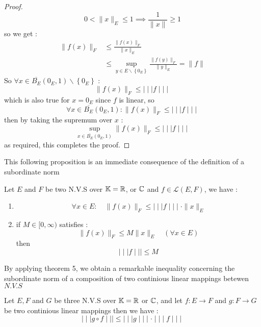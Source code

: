 \begin{proof}
  \[
  0 < \| x \| _{E} \leq 1 \implies 
  \frac{1}{\| x \| } \geq 1
  \]
  so we get : 
  \begin{align*}
	  \| f(x)  \| _{F} &\leq 
  \frac{\| f(x)  \|_{F} }{\| x \|_{E} }  \\
			   & \leq 
			   \sup_{ y \in E \backslash \left\{ 0_{E} \right\}} 
			   \frac{\| f(y)  \| _{F}}{ 
			   \| y \| _{E}} = 
			   \| f \|  
  \end{align*}
  So $ \forall  x \in \overline{B_{E}}\left( 0_{E},1 \right) 
  \backslash \left\{ 0_{E} \right\}$ : 
  \[
  \| f(x)  \| _{F} \leq \mid \mid \mid  f \mid \mid \mid 
  \]
  which is also true for $x = 0_{E}$ since $f$ is linear, so 
  \[
  \forall  x \in  \overline{B_{E}} \left( 0_{E},1 \right) :
  \| f(x)  \| _{F} \leq \mid \mid \mid  f \mid \mid \mid 
  \]
  then by taking the supremum over $x$ : 
  \[
  \sup_{ x \in \overline{B_{E}} \left( 0_{E},1 \right)}  
  \| f(x)  \| _{F} \leq 
  \mid \mid \mid  f \mid \mid \mid 
  \]
  as required, this completes the proof.
 \end{proof}
 This following proposition is an immediate consequence of 
 the definition of a subordinate norm
 \begin{theorem}[]
 Let $E$ and $F$ be two N.V.S over $\mathbb{K} = \mathbb{R} $, or
 $\mathbb{C} $ and $f \in \mathcal{L}  \left( E,F \right)$, we have : 
 \begin{enumerate}
 \item 
	 \[
	 \forall  x \in  E: \quad \| f(x)  \| _{F} \leq 
	 \mid \mid \mid  f \mid \mid \mid  \cdot 
	 \| x \| _{E}
	 \]
 \item   if $M \in [0,\infty )$  satisfies : 
	 \[
		 \| f(x)  \| _{F} \leq 
		 M \| x \| _{E}  \quad 
		 \left( \forall x \in E \right)
	 \]
	then 
	\[
	\mid \mid \mid  f \mid \mid \mid  \leq 
	M
	\]
 \end{enumerate}
 \end{theorem}
By applying theorem 5, we obtain a remarkable 
inequality concerning the subordinate norm of a composition
of two continious linear mappings betewen $N.V.S$ 
 \begin{theorem}[]
 Let $E,F$ and $G$ be three N.V.S over $\mathbb{K} = \mathbb{R} $  or
 $\mathbb{C} $, and let $ f : E \longrightarrow F $ and 
 $ g : F \longrightarrow G $ be two continious linear mappings
 then we have : 
 \[
 \mid \mid \mid  g \circ f \mid \mid \mid  \leq 
 \mid \mid \mid  g \mid \mid \mid 
 \cdot 
 \mid \mid \mid  f \mid \mid \mid 
 \]
 \end{theorem}
